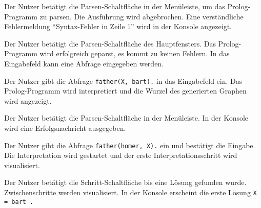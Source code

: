\documentclass[parskip=full,11pt,twoside]{scrartcl}
\begin{document}

{Der Nutzer betätigt die Parsen-Schaltfläche in der Menüleiste, um das Prolog-Programm zu parsen.}
{Die Ausführung wird abgebrochen. Eine verständliche Fehlermeldung \enquote{Syntax-Fehler in Zeile 1} wird in der Konsole angezeigt.}


{Der Nutzer betätigt die Parsen-Schaltfläche des Hauptfensters.}
{Das Prolog-Programm wird erfolgreich geparst, es kommt zu keinen Fehlern. In das Eingabefeld kann eine Abfrage eingegeben werden.}

{Der Nutzer gibt die Abfrage \texttt{father(X, bart).} in das Eingabefeld ein.}
{Das Prolog-Programm wird interpretiert und die Wurzel des generierten Graphen wird angezeigt.}

\begin{minipage}{\linewidth}
\end{minipage}


{Der Nutzer betätigt die Parsen-Schaltfläche in der Menüleiste.}
{In der Konsole wird eine Erfolgsnachricht ausgegeben.}

{Der Nutzer gibt die Abfrage \texttt{father(homer, X).} ein und bestätigt die Eingabe.}
{Die Interpretation wird gestartet und der erste Interpretationsschritt wird visualisiert.}

{Der Nutzer betätigt die Schritt-Schaltfläche bis eine Lösung gefunden wurde.}
{Zwischenschritte werden visualisiert. In der Konsole erscheint die erste Lösung \texttt{X = bart .}}
\end{document}
